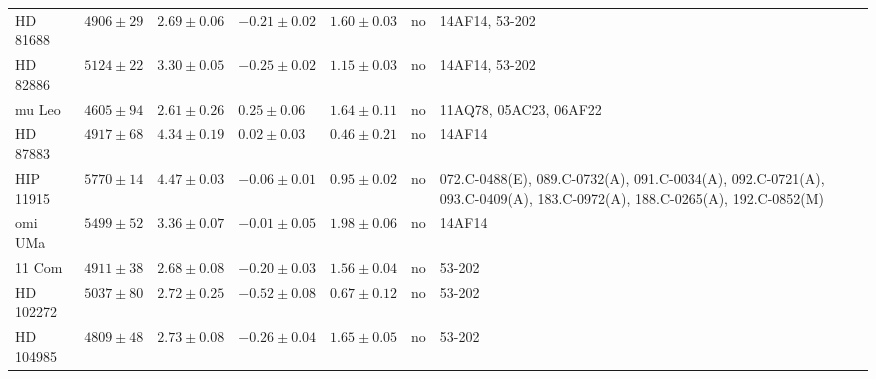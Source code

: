 \documentclass{aa}
\begin{document}
\begin{table*}[htb!]
\begin{tabular}{lllllll}
     HD 81688     &  $4906 \pm  29$      &  $2.69 \pm 0.06$    &  $-0.21 \pm 0.02$    &  $1.60 \pm 0.03$             &             no              &  14AF14, 53-202                                                                                                          \\
     HD 82886     &  $5124 \pm  22$      &  $3.30 \pm 0.05$    &  $-0.25 \pm 0.02$    &  $1.15 \pm 0.03$             &             no              &  14AF14, 53-202                                                                                                          \\
       mu Leo     &  $4605 \pm  94$      &  $2.61 \pm 0.26$    &  $ 0.25 \pm 0.06$    &  $1.64 \pm 0.11$             &             no              &  11AQ78, 05AC23, 06AF22                                                                                                  \\
     HD 87883     &  $4917 \pm  68$      &  $4.34 \pm 0.19$    &  $ 0.02 \pm 0.03$    &  $0.46 \pm 0.21$             &             no              &  14AF14                                                                                                                  \\
    HIP 11915     &  $5770 \pm  14$      &  $4.47 \pm 0.03$    &  $-0.06 \pm 0.01$    &  $0.95 \pm 0.02$             &             no              &  072.C-0488(E), 089.C-0732(A), 091.C-0034(A), 092.C-0721(A), 093.C-0409(A), 183.C-0972(A), 188.C-0265(A), 192.C-0852(M)  \\
      omi UMa     &  $5499 \pm  52$      &  $3.36 \pm 0.07$    &  $-0.01 \pm 0.05$    &  $1.98 \pm 0.06$             &             no              &  14AF14                                                                                                                  \\
       11 Com     &  $4911 \pm  38$      &  $2.68 \pm 0.08$    &  $-0.20 \pm 0.03$    &  $1.56 \pm 0.04$             &             no              &  53-202                                                                                                                  \\
    HD 102272     &  $5037 \pm  80$      &  $2.72 \pm 0.25$    &  $-0.52 \pm 0.08$    &  $0.67 \pm 0.12$             &             no              &  53-202                                                                                                                  \\
    HD 104985     &  $4809 \pm  48$      &  $2.73 \pm 0.08$    &  $-0.26 \pm 0.04$    &  $1.65 \pm 0.05$             &             no              &  53-202                                                                                                                  \\

\end{tabular}
\end{table*}
\end{document}
